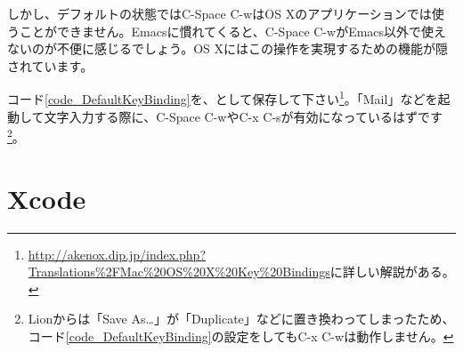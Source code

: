 しかし、デフォルトの状態ではC-Space C-wはOS Xのアプリケーションでは使うことができません。Emacsに慣れてくると、C-Space C-wがEmacs以外で使えないのが不便に感じるでしょう。OS Xにはこの操作を実現するための機能が隠されています。

コード\ref{code_DefaultKeyBinding}を、として保存して下さい\footnote{\url{http://akenox.dip.jp/index.php?Translations\%2FMac\%20OS\%20X\%20Key\%20Bindings}に詳しい解説がある。}。「Mail」などを起動して文字入力する際に、C-Space C-wやC-x C-sが有効になっているはずです\footnote{Lionからは「Save As\ldots」が「Duplicate」などに置き換わってしまったため、コード\ref{code_DefaultKeyBinding}の設定をしてもC-x C-wは動作しません。}。





\section{Xcode}